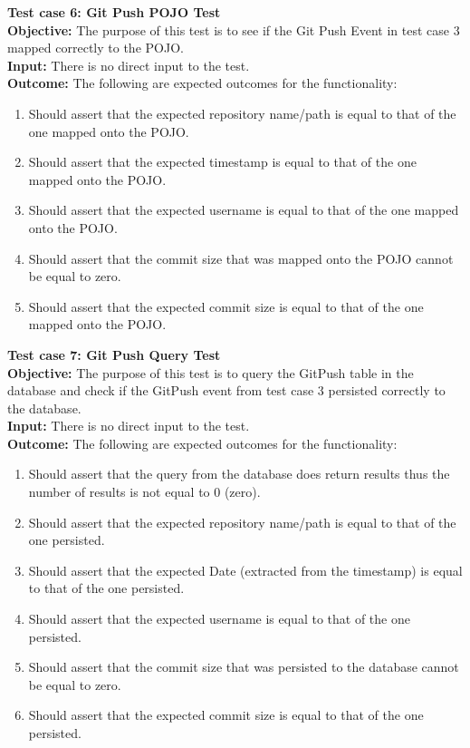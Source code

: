 \documentclass[11pt,a4paper]{article}
\begin{document}
\noindent
\textbf{Test case 6: Git Push POJO Test} \\
\textbf{Objective: } The purpose of this test is to see if the Git Push Event in test case 3 mapped correctly to the POJO. \\
\textbf{Input: } There is no direct input to the test. \\
\textbf{Outcome: } The following are expected outcomes for the functionality:
\begin{enumerate}
	\item Should assert that the expected repository name/path is equal to that of the one mapped onto the POJO.
	\item Should assert that the expected timestamp is equal to that of the one mapped onto the POJO.
	\item Should assert that the expected username is equal to that of the one mapped onto the POJO.
	\item Should assert that the commit size that was mapped onto the POJO cannot be equal to zero.
	\item Should assert that the expected commit size is equal to that of the one mapped onto the POJO.\\
\end{enumerate}
\noindent
\textbf{Test case 7: Git Push Query Test} \\
\textbf{Objective: } The purpose of this test is to query the GitPush table in the database and check if the GitPush event from test case 3 persisted correctly to the database. \\
\textbf{Input: } There is no direct input to the test. \\
\textbf{Outcome: } The following are expected outcomes for the functionality:
\begin{enumerate}
	\item Should assert that the query from the database does return results thus the number of results is not equal to 0 (zero).
	\item Should assert that the expected repository name/path is equal to that of the one persisted.
	\item Should assert that the expected Date (extracted from the timestamp) is equal to that of the one persisted.
	\item Should assert that the expected username is equal to that of the one persisted.
	\item Should assert that the commit size that was persisted to the database cannot be equal to zero.
	\item Should assert that the expected commit size is equal to that of the one persisted.\\
\end{enumerate}
\end{document}
